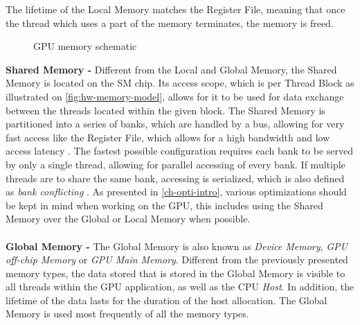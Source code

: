 The lifetime of the Local Memory matches the Register File, meaning that once the thread which uses a part of the memory terminates, the memory is freed.
\begin{figure}[H]
	\centering
	\caption{GPU memory schematic}
	\label{fig:hw-memory-schematic}
\end{figure}
\noindent \textbf{Shared Memory -} Different from the Local and Global Memory, the Shared Memory is located on the SM chip.
Its access scope, which is per Thread Block as illustrated on \cref{fig:hw-memory-model}, allows for it to be used for data exchange  between the threads located within the given block.
The Shared Memory is partitioned into a series of banks, which are handled by a bus, allowing for very fast access like the Register File, which allows for a high bandwidth and low access latency \cite{Li2016}.
The fastest possible configuration requires each bank to be served by only a single thread, allowing for parallel accessing of every bank.
If multiple threads are to share the same bank, accessing is serialized, which is also defined as \textit{bank conflicting} \cite{Maitre2013}.
As presented in \cref{ch-opti-intro}, various optimizations should be kept in mind when working on the GPU, this includes using the Shared Memory over the Global or Local Memory when possible.
\\\\
\textbf{Global Memory -} The Global Memory is also known as \textit{Device Memory}, \textit{GPU off-chip Memory} or \textit{GPU Main Memory}.
Different from the previously presented memory types, the data stored that is stored in the Global Memory is visible to all threads within the GPU application, as well as the CPU \textit{Host}. 
In addition, the lifetime  of the data lasts for the duration of the host allocation.
The Global Memory is used most frequently of all the memory types.
